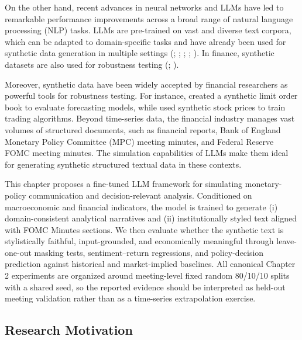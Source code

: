 On the other hand, recent advances in neural networks and LLMs have led to remarkable performance improvements across a broad range of natural language processing (NLP) tasks. LLMs are pre-trained on vast and diverse text corpora, which can be adapted to domain-specific tasks and have already been used for synthetic data generation in multiple settings (\cite{schick2021generating}; \cite{peng2023instruction}; \cite{yu2024large}; \cite{li2021synthetic}; \cite{meoni2024generating}). In finance, synthetic datasets are also used for robustness testing (\cite{cao2022synthetic}; \cite{carvajal2022synthetic}).


Moreover, synthetic data have been widely accepted by financial researchers as powerful tools for robustness testing. For instance, \cite{cao2022synthetic} created a synthetic limit order book to evaluate forecasting models, while \cite{carvajal2022synthetic} used synthetic stock prices to train trading algorithms. Beyond time-series data, the financial industry manages vast volumes of structured documents, such as financial reports, Bank of England Monetary Policy Committee (MPC) meeting minutes, and Federal Reserve FOMC meeting minutes. The simulation capabilities of LLMs make them ideal for generating synthetic structured textual data in these contexts.

This chapter proposes a fine-tuned LLM framework for simulating monetary-policy communication and decision-relevant analysis. Conditioned on macroeconomic and financial indicators, the model is trained to generate (i) domain-consistent analytical narratives and (ii) institutionally styled text aligned with FOMC Minutes sections. We then evaluate whether the synthetic text is stylistically faithful, input-grounded, and economically meaningful through leave-one-out masking tests, sentiment--return regressions, and policy-decision prediction against historical and market-implied baselines. All canonical Chapter 2 experiments are organized around meeting-level fixed random 80/10/10 splits with a shared seed, so the reported evidence should be interpreted as held-out meeting validation rather than as a time-series extrapolation exercise.



\subsection*{Research Motivation}

